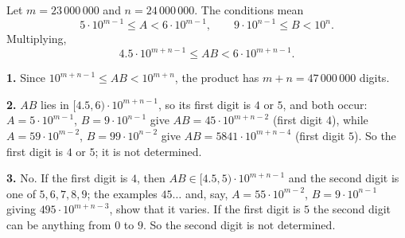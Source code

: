 Let $m=23\,000\,000$ and $n=24\,000\,000$. The conditions mean
\[
5\cdot10^{m-1}\le A<6\cdot10^{m-1},\qquad 9\cdot10^{n-1}\le B<10^{n}.
\]
Multiplying,
\[
4.5\cdot10^{m+n-1}\le AB<6\cdot10^{m+n-1}.
\]

\textbf{1.} Since $10^{m+n-1}\le AB<10^{m+n}$, the product has $m+n=\boxed{47\,000\,000}$ digits.

\textbf{2.} $AB$ lies in $[4.5,6)\cdot10^{m+n-1}$, so its first digit is $4$ or $5$, and both occur: $A=5\cdot10^{m-1}$, $B=9\cdot10^{n-1}$ give $AB=45\cdot10^{m+n-2}$ (first digit $4$), while $A=59\cdot10^{m-2}$, $B=99\cdot10^{n-2}$ give $AB=5841\cdot10^{m+n-4}$ (first digit $5$). So the first digit is $\boxed{4\text{ or }5}$; it is not determined.

\textbf{3.} No. If the first digit is $4$, then $AB\in[4.5,5)\cdot10^{m+n-1}$ and the second digit is one of $5,6,7,8,9$; the examples $45\ldots$ and, say, $A=55\cdot10^{m-2}$, $B=9\cdot10^{n-1}$ giving $495\cdot10^{m+n-3}$, show that it varies. If the first digit is $5$ the second digit can be anything from $0$ to $9$. So the second digit is $\boxed{\text{not determined}}$.
